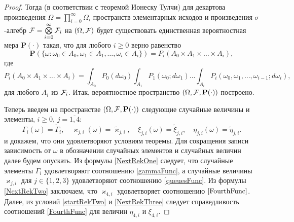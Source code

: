 \documentclass[a4paper,twoside]{article}
\theoremstyle{theorem}
\theoremstyle{remark}
\renewcommand{\Pr}{{\mathbf P}}
\begin{document}
\begin{proof}
Тогда (в соответствии с теоремой Ионеску Тулчи) для декартова произведения $\Omega=\prod\limits_{i=0}^{\infty}\Omega_i$ пространств элементарных исходов и произведения $\sigma$-алгебр ${\cal F}=\bigotimes\limits_{i=0}^{\infty} {\cal F}_i$ на $(\Omega,{\cal F})$ будет существовать единственная вероятностная мера $\Pr(\cdot)$ такая, что для любого $i \geqslant 0$ верно равенство
\begin{equation}
\Pr(\{\omega \colon \omega_0 \in A_0, \omega_1 \in A_1, \ldots, \omega_i\in A_i\})= P_i(A_0 \times A_1 \times \ldots \times A_i),
\label{ProbabilitiesGeneral}
\end{equation}
где 
\begin{equation}
 P_i(A_0 \times A_1 \times \ldots \times A_i) = \int_{A_0} P_0(d \omega_0) \int_{A_1} P_1(\omega_0;d \omega_1) \ldots \int_{A_i} P_i(\omega_0, \omega_1, \ldots, \omega_{i-1}; d \omega_i),
\label{ProbabilitiesGeneralOne}
\end{equation}
для любого $A_i$ из ${\cal F}_i$. Итак, вероятностное пространство $(\Omega,{\cal F},\Pr(\cdot))$ построено. 

Теперь введем на пространстве $(\Omega,{\cal F},\Pr(\cdot))$ следующие случайные величины и элементы, $i \geqslant 0$, $j =\overline{1,4}$:
\begin{equation*}
    \Gamma_i(\omega) = \tilde{\Gamma}_i, \quad \varkappa_{j,i}(\omega) = \tilde{\varkappa}_{j,i},\quad
    \xi_{j,i}(\omega) = \tilde{\xi}_{j,i}, \quad \eta_{j,i}(\omega) = \tilde{\eta}_{j,i}.
\end{equation*}
и докажем, что они  удовлетворяют условиям теоремы. Для сокращения записи зависимость от $\omega$ в обозначении случайных элементов и случайных величин далее будем опускать. Из формулы \eqref{NextRekOne} следует, что случайные элементы $\Gamma_i$ удовлетворяют соотношению \eqref{gammaFunc}, а случайные величины $\varkappa_{j,i}$ для $j\in \{1, 2, 3\}$ удовлетворяют соотношению \eqref{queuesFunc}. Из формулы \eqref{NextRekTwo} заключаем, что $\varkappa_{4,i}$ удовлетворяет соотношению $\eqref{FourthFunc}$. Далее, из условий \eqref{startRekTwo} и \eqref{NextRekThree} следует справедливость соотношений \eqref{FourthFunc} для величин $\eta_{4,i}$ и $\xi_{4,i}$. 


\end{proof}
\end{document}
